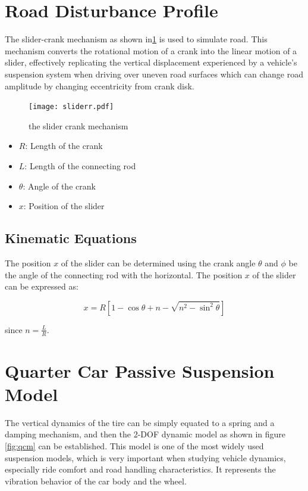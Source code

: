 \section{Road Disturbance Profile}
The slider-crank mechanism as shown in\ref{fig:sliderr} is used to simulate road. This mechanism converts the rotational motion of a crank into the linear motion of a slider, effectively replicating the vertical displacement experienced by a vehicle's suspension system when driving over uneven road surfaces which can change road amplitude by changing eccentricity from crank disk.
\begin{figure}[H]
	\centering
	\texttt{[image: sliderr.pdf]}
	\caption{the slider crank mechanism}
	\label{fig:sliderr}
\end{figure}

\begin{itemize}
	\item $R$: Length of the crank
	\item $L$: Length of the connecting rod
	\item $\theta $: Angle of the crank 
	\item $x$: Position of the slider
\end{itemize}
\newpage
\subsection*{Kinematic Equations}

The position \( x \) of the slider can be determined using the crank angle \( \theta \) and \( \phi \) be the angle of the connecting rod with the horizontal. The position \( x \) of the slider can be expressed as:

\[
x = R \left[ 1 - \cos \theta + n - \sqrt{n^2 - \sin^2 \theta} \right]
\]

since \( n = \frac{L}{R} \).







\iffalse
\section{Quarter Car Passive Suspension Model}

The vertical dynamics of the tire can be simply equated to a spring and a damping mechanism, and then the 2-DOF dynamic model as shown in figure \ref{fig:qcm} can be established.
This model is one of the most widely used suspension models, which is very important when studying vehicle dynamics, especially ride comfort and road handling characteristics. It represents the vibration behavior of the car body and the wheel. \cite{sun2020advanced}

